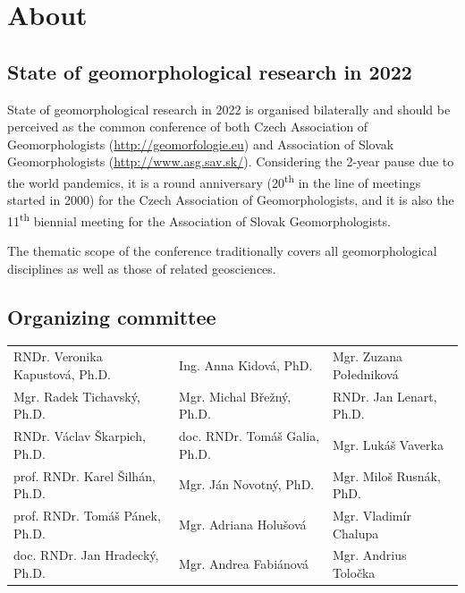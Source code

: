 \documentclass[
	openany, %
	parskip=false, %
	12pt, %
	a4paper, %
]{conferencebooklet} %
\begin{document}
\newpage


\tableofcontents


\chapter{About}
\section{State of geomorphological research in 2022}
\noindent
State of geomorphological research in 2022 is organised bilaterally and should be perceived as the common conference of both Czech Association of Geomorphologists (\url{http://geomorfologie.eu}) and Association of Slovak Geomorphologists (\url{http://www.asg.sav.sk/}). Considering the 2-year pause due to the world pandemics, it is a round anniversary (20\textsuperscript{th} in the line of meetings started in 2000) for the Czech Association of Geomorphologists, and it is also the 11\textsuperscript{th} biennial meeting for the Association of Slovak Geomorphologists.

The thematic scope of the conference traditionally covers all geomorphological disciplines as well as those of related geosciences. 

\vspace{5em}
\section{Organizing committee}
\begin{flushleft}
\begin{table}[h!]
 \begin{tabular}{l l l}
RNDr. Veronika Kapustová, Ph.D. & Ing. Anna Kidová, PhD. & Mgr. Zuzana Połedniková\\
Mgr. Radek Tichavský, Ph.D. & Mgr. Michal Břežný, Ph.D. &  RNDr. Jan Lenart, Ph.D. \\
RNDr. Václav Škarpich, Ph.D. & doc. RNDr. Tomáš Galia, Ph.D. & Mgr. Lukáš Vaverka\\
prof. RNDr. Karel Šilhán, Ph.D. & Mgr. Ján Novotný, PhD. & Mgr. Miloš Rusnák, PhD.\\
prof. RNDr. Tomáš Pánek, Ph.D. & Mgr. Adriana Holušová & Mgr. Vladimír Chalupa\\
doc. RNDr. Jan Hradecký, Ph.D. & Mgr. Andrea Fabiánová & Mgr. Andrius Toločka 
\end{tabular}
\end{table}
\end{flushleft}
\end{document}
